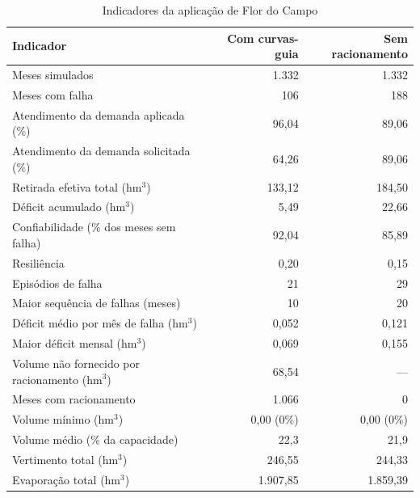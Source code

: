 \begin{table}[!htbp]
    \captionsetup{width=15cm}
    \caption{Indicadores da aplicação de Flor do Campo}
    \label{tab:flor-indicadores}
    \centering
    \footnotesize
    \begin{tabular}{lrr}
        \toprule
        Indicador & Com curvas-guia & Sem racionamento \\
        \midrule
        Meses simulados & 1.332 & 1.332 \\
        Meses com falha & 106 & 188 \\
        Atendimento da demanda aplicada (\%) & 96,04 & 89,06 \\
        Atendimento da demanda solicitada (\%) & 64,26 & 89,06 \\
        Retirada efetiva total (hm$^3$) & 133,12 & 184,50 \\
        Déficit acumulado (hm$^3$) & 5,49 & 22,66 \\
        Confiabilidade (\% dos meses sem falha) & 92,04 & 85,89 \\
        Resiliência & 0,20 & 0,15 \\
        Episódios de falha & 21 & 29 \\
        Maior sequência de falhas (meses) & 10 & 20 \\
        Déficit médio por mês de falha (hm$^3$) & 0,052 & 0,121 \\
        Maior déficit mensal (hm$^3$) & 0,069 & 0,155 \\
        Volume não fornecido por racionamento (hm$^3$) & 68,54 & --- \\
        Meses com racionamento & 1.066 & 0 \\
        Volume mínimo (hm$^3$) & 0,00 (0\%) & 0,00 (0\%) \\
        Volume médio (\% da capacidade) & 22,3 & 21,9 \\
        Vertimento total (hm$^3$) & 246,55 & 244,33 \\
        Evaporação total (hm$^3$) & 1.907,85 & 1.859,39 \\
        \bottomrule
    \end{tabular}
\end{table}

